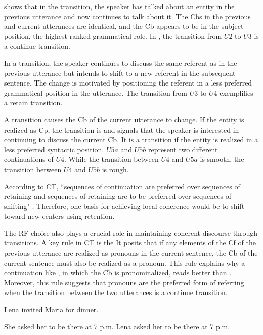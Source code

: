  shows that in the  transition, the speaker has talked about an entity in the previous utterance and now continues to talk about it. The Cbs in the previous and current utterances are identical, and the Cb appears to be in the subject position, the highest-ranked grammatical role. In , the transition from $U2$ to $U3$ is a continue transition.

In a  transition, the speaker continues to discuss the same referent as in the previous utterance but intends to shift to a new referent in the subsequent sentence. The change is motivated by positioning the referent in a less preferred grammatical position in the utterance. The transition from $U3$ to $U4$ exemplifies a retain transition.


A  transition causes the Cb of the current utterance to change. If the entity is realized as Cp, the transition is  and signals that the speaker is interested in continuing to discuss the current Cb. It is a  transition if the entity is realized in a less preferred syntactic position. $U5a$ and $U5b$ represent two different continuations of $U4$. While the transition between $U4$ and $U5a$ is smooth, the transition between $U4$ and $U5b$ is rough.

According to CT, ``sequences of continuation are preferred over sequences of retaining and sequences of retaining are to be preferred over sequences of shifting" \citep[17]{grosz1995centering}. Therefore, one basis for achieving local coherence would be to shift toward new centers using retention.

The RF choice also plays a crucial role in maintaining coherent discourse through transitions. A key rule in CT is the  It posits that if any elements of the Cf of the previous utterance are realized as pronouns in the current sentence, the Cb of the current sentence must also be realized as a pronoun. This rule explains why a continuation like , in which the Cb is pronominalized, reads better than . Moreover, this rule suggests that pronouns are the preferred form of referring when the transition between the two utterances is a continue transition.

\begin{exe}
	\ex Lena invited Maria for dinner. 
	\ex
	\begin{xlist}
		\ex She asked her to be there at 7 p.m. \label{ex:ctpron1}
		\ex Lena asked her to be there at 7 p.m. \label{ex:ctpron2} 
	\end{xlist}
	
\end{exe}

